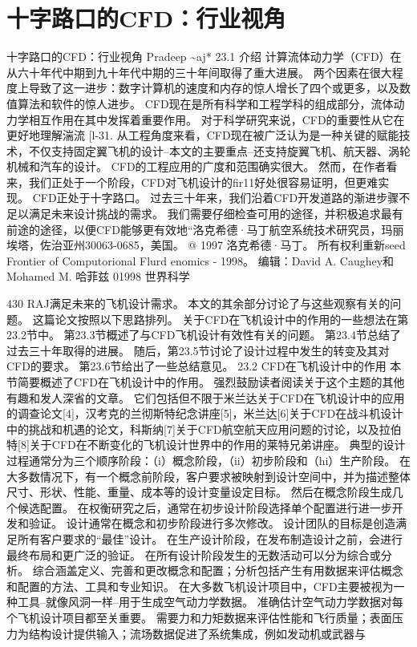 \documentclass[UTF8,11pt,a4paper,openany,fontset=fandol]{ctexbook}
\begin{document}
\clearpage
\chapter{十字路口的CFD：行业视角}
十字路口的CFD：行业视角 Pradeep \textasciitilde{}aj* 23.1 介绍 计算流体动力学（CFD）在从六十年代中期到九十年代中期的三十年间取得了重大进展。 两个因素在很大程度上导致了这一进步：数字计算机的速度和内存的惊人增长了四个或更多，以及数值算法和软件的惊人进步。 CFD现在是所有科学和工程学科的组成部分，流体动力学相互作用在其中发挥着重要作用。 对于科学研究来说，CFD的重要性从它在更好地理解湍流 [l-31. 从工程角度来看，CFD现在被广泛认为是一种关键的赋能技术，不仅支持固定翼飞机的设计--本文的主要重点--还支持旋翼飞机、航天器、涡轮机械和汽车的设计。 CFD的工程应用的广度和范围确实很大。 然而，在作者看来，我们正处于一个阶段，CFD对飞机设计的fir11好处很容易证明，但更难实现。 CFD正处于十字路口。 过去三十年来，我们沿着CFD开发道路的渐进步骤不足以满足未来设计挑战的需求。 我们需要仔细检查可用的途径，并积极追求最有前途的途径，以便CFD能够更有效地“洛克希德·马丁航空系统技术研究员，玛丽埃塔，佐治亚州30063-0685，美国。 @ 1997 洛克希德·马丁。 所有权利重新seed Frontier of Computorional Flurd enomics - 1998。 编辑：David A. Caughey和Mohamed M. 哈菲兹 01998 世界科学

430 RAJ满足未来的飞机设计需求。 本文的其余部分讨论了与这些观察有关的问题。 这篇论文按照以下思路排列。 关于CFD在飞机设计中的作用的一些想法在第23.2节中。 第23.3节概述了与CFD飞机设计有效性有关的问题。 第23.4节总结了过去三十年取得的进展。 随后，第23.5节讨论了设计过程中发生的转变及其对CFD的要求。 第23.6节给出了一些总结意见。 23.2 CFD在飞机设计中的作用 本节简要概述了CFD在飞机设计中的作用。 强烈鼓励读者阅读关于这个主题的其他有趣和发人深省的文章。 它们包括但不限于米兰达关于CFD在飞机设计中的应用的调查论文[4]，汉考克的兰彻斯特纪念讲座[5]，米兰达[6]关于CFD在战斗机设计中的挑战和机遇的论文，科斯纳[7]关于CFD航空航天应用问题的讨论，以及拉伯特[8]关于CFD在不断变化的飞机设计世界中的作用的莱特兄弟讲座。 典型的设计过程通常分为三个顺序阶段：（i）概念阶段，（ii）初步阶段和（hi）生产阶段。 在大多数情况下，有一个概念前阶段，客户要求被映射到设计空间中，并为描述整体尺寸、形状、性能、重量、成本等的设计变量设定目标。 然后在概念阶段生成几个候选配置。 在权衡研究之后，通常在初步设计阶段选择单个配置进行进一步开发和验证。 设计通常在概念和初步阶段进行多次修改。 设计团队的目标是创造满足所有客户要求的“最佳”设计。 在生产设计阶段，在发布制造设计之前，会进行最终布局和更广泛的验证。 在所有设计阶段发生的无数活动可以分为综合或分析。 综合涵盖定义、完善和更改概念和配置；分析包括产生有用数据来评估概念和配置的方法、工具和专业知识。 在大多数飞机设计项目中，CFD主要被视为一种工具--就像风洞一样--用于生成空气动力学数据。 准确估计空气动力学数据对每个飞机设计项目都至关重要。 需要力和力矩数据来评估性能和飞行质量；表面压力为结构设计提供输入；流场数据促进了系统集成，例如发动机或武器与
\end{document}
